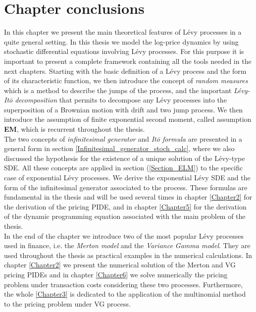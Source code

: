 \section{Chapter conclusions}

In this chapter we present the main theoretical features of Lévy processes in a quite general setting. 
In this thesis we model the log-price dynamics by using stochastic differential equations involving Lévy processes. 
For this purpose it is important to present a complete framework containing all the tools needed in the next chapters.
Starting with the basic definition of a Lévy process and the form of its characteristic function, we then introduce the concept of \emph{random measures}
which is a method to describe the jumps of the process, and the important \emph{Lévy-It\=o decomposition} that permits to decompose any Lévy processes into 
the superposition of a Brownian motion with drift and two jump process.
We then introduce the assumption of finite exponential second moment, called assumption \textbf{EM}, which is recurrent throughout the thesis.\\
The two concepts of \emph{infinitesimal generator} and \emph{It\=o formula} are presented in a general form in section \ref{Infinitesimal_generator_stoch_calc}, where we 
also discussed the hypothesis for the existence of a unique solution of the Lévy-type SDE. 
All these concepts are applied in section (\ref{Section_ELM}) to the specific case of exponential Lévy processes. 
We derive the exponential Lévy SDE and the form of the infinitesimal generator associated to the process.   
These formulas are fundamental in the thesis and will be used several times in chapter \ref{Chapter2} 
for the derivation of the pricing PIDE, and in chapter \ref{Chapter5} for the derivation of the 
dynamic programming equation associated with the main problem of the thesis.\\
In the end of the chapter we introduce two of the most popular Lévy processes used in finance, i.e. the \emph{Merton model} and the \emph{Variance Gamma model}.
They are used throughout the thesis as practical examples in the numerical calculations.
In chapter \ref{Chapter2} we present the numerical solution of the Merton and VG pricing PIDEs and 
in chapter \ref{Chapter6} we solve numerically the pricing problem under transaction costs considering these two processes.
Furthermore, the whole \ref{Chapter3} is dedicated to the application of the multinomial method to the pricing problem under VG process. 



